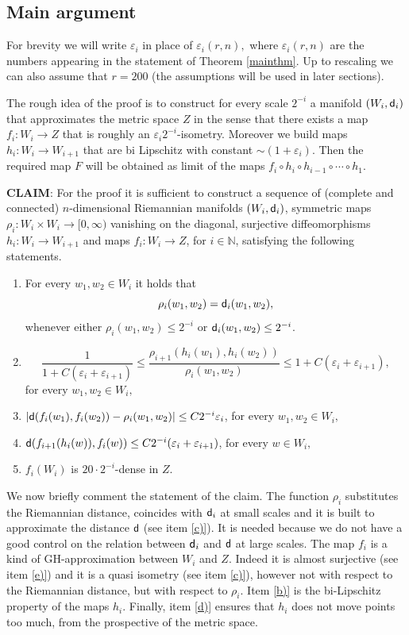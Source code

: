 \documentclass[11pt]{article}
\newcommand{\eps}{\varepsilon}
\newcommand{\sfd}{{\sf d}}
\theoremstyle{plain}
\theoremstyle{definition}
\numberwithin{equation}{section}
\begin{document}
\subsection{Main argument}\label{sec:main argument}
 For brevity we will  write $\eps_i$ in place of $\eps_i(r,n),$ where  $\eps_i(r,n)$ are the numbers appearing in the statement of Theorem \ref{mainthm}. Up to rescaling we can also assume that $r=200$ (the assumptions will be used in later sections).
 
The rough idea of the proof is to construct for every scale $2^{-i}$  a manifold $(W_i,\sfd_i)$ that approximates the metric space $Z$  in the sense that there exists a map $f_i : W_i \to Z$  that is roughly an $\eps_i2^{-i}$-isometry. Moreover we build maps $h_i : W_i \to W_{i +1}$ that are bi Lipschitz  with  constant $\sim (1+\eps_i)$.  Then the required map $F$ will be obtained as limit of the maps $f_i\circ h_i\circ h_{i-1}\circ \cdots \circ h_1$.


{ {\bf CLAIM}}:	For the proof it is sufficient to construct  a sequence of (complete and connected) $n$-dimensional Riemannian manifolds $(W_i,\sfd_i)$, symmetric maps $\rho_i : W_i \times W_i \to [0,\infty)$ vanishing on the diagonal, surjective diffeomorphisms $h_i : W_i \to W_{i+1}$ and maps $f_i: W_i \to Z$, for $i \in \mathbb{N}$, satisfying the following statements.
\begin{enumerate}[label=\alph*)]
	\item \label{a)} For every $w_1,w_2 \in W_i$  it holds that
	$$\rho_i(w_1,w_2)=\sfd_i(w_1,w_2),$$
	whenever either $\rho_i(w_1,w_2)\le 2^{-i}$ or $\sfd_i(w_1,w_2)\le 2^{-i}$.
	\item \label{b)}$$\frac{1}{1+C(\eps_i+\eps_{i+1})}\le\frac{\rho_{i+1}(h_i(w_1),h_i(w_2))}{\rho_i(w_1,w_2)}\le 1+C(\eps_i+\eps_{i+1}),$$
	for every $w_1,w_2 \in W_i,$
	\item \label{c)}$|\sfd(f_i(w_1),f_i(w_2))-\rho_i(w_1,w_2)|\le C2^{-i}\eps_i$, for every $w_1,w_2 \in W_i,$
	\item \label{d)}$\sfd(f_{i+1}(h_i(w)),f_i(w))\le C 2^{-i}(\eps_i+\eps_{i+1})$, for every $w \in W_i,$
	\item \label{e)}$f_i(W_i)$ is $ 20 \cdot 2^{-i}$-dense in $Z$.
\end{enumerate}

We now briefly comment the statement of the claim. The function $\rho_i$ substitutes the Riemannian distance, coincides with $\sfd_i$ at small scales and it is built to approximate the distance $\sfd$ (see item \ref{c)}). It is needed because we do not have a good control on the relation between $\sfd_i$ and $\sfd$ at large scales. The  map $f_i$ is a kind of GH-approximation between $W_i$ and $Z$. Indeed it is almost surjective (see item \ref{e)}) and it is a quasi isometry (see item \ref{c)}), however not with respect to the Riemannian distance, but with respect to $\rho_i$. Item \ref{b)} is the bi-Lipschitz property of the maps $h_i$. Finally, item \ref{d)} ensures that $h_i$ does not move points too much, from the prospective of the metric space.\\
\end{document}
